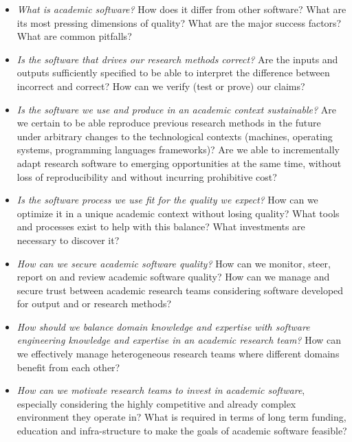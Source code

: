 \documentclass[a4paper,UKenglish]{dagman}
\begin{document}
\begin{itemize}
\item \emph{What is academic software?} How does it differ from other software? What are its most pressing dimensions of quality? What are the major success factors? What are common pitfalls?
\item \emph{Is the software that drives our research methods correct?} Are the inputs and outputs sufficiently specified to be able to interpret the difference between incorrect and correct? How can we verify (test or prove) our claims?
\item \emph{Is the software we use and produce in an academic context sustainable?}
Are we certain to be able reproduce previous research methods in the future under arbitrary changes to the technological contexts (machines, operating systems, programming languages frameworks)? Are we able to incrementally adapt research software to emerging opportunities at the same time, without loss of reproducibility and without incurring prohibitive cost?
\item \emph{Is the software process we use fit for the quality we expect?} How can we optimize it in a unique academic context without losing quality? What tools and processes exist to help with this balance? What investments are necessary to discover it?
\item \emph{How can we secure academic software quality?} How can we monitor, steer, report on and review academic software quality? How can we manage and secure trust between academic research teams considering software developed for output and or research methods?
\item \emph{How should we balance domain knowledge and expertise with software engineering knowledge and expertise in an academic research team?} How can we effectively manage heterogeneous research teams where different domains benefit from each other?
\item \emph{How can we motivate research teams to invest in academic software}, especially considering the highly competitive and already complex environment they operate in?
What is required in terms of long term funding, education and infra-structure to make the goals of academic software feasible?
\end{itemize}
\end{document}
